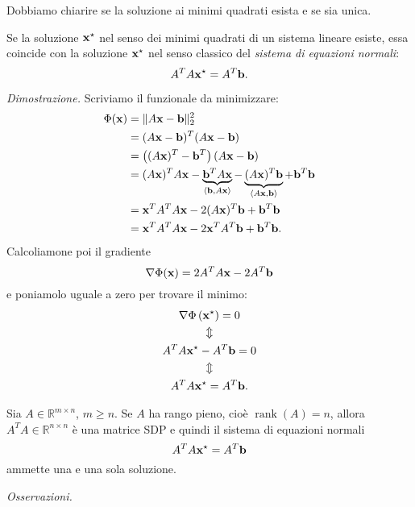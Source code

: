 Dobbiamo chiarire se la soluzione ai minimi quadrati esista e se sia unica.
\begin{lemma}
Se la soluzione $\mathbf{x}^{\star }$ nel senso dei minimi quadrati di un sistema lineare esiste, essa coincide con la soluzione $\mathbf{x}^{\star }$ nel senso classico del \textit{sistema di equazioni normali}:
\begin{equation*}
A^{T} A\mathbf{x}^{\star } =A^{T}\mathbf{b}.
\end{equation*}
\end{lemma}
\textit{Dimostrazione.}
Scriviamo il funzionale da minimizzare:
\begin{align*}
\Phi (\mathbf{x}) & =\Vert A\mathbf{x} -\mathbf{b}\Vert ^{2}_{2}\\
 & =( A\mathbf{x} -\mathbf{b})^{T}( A\mathbf{x} -\mathbf{b})\\
 & =\left(( A\mathbf{x})^{T} -\mathbf{b}^{T}\right)( A\mathbf{x} -\mathbf{b})\\
 & =( A\mathbf{x})^{T} A\mathbf{x}-\underbrace{\mathbf{b}^{T}A\mathbf{x}}_{\langle \mathbf{b} ,A\mathbf{x} \rangle } -\underbrace{( A\mathbf{x})^{T}\mathbf{b}}_{\langle A\mathbf{x} ,\mathbf{b} \rangle } +\mathbf{b}^{T}\mathbf{b}\\
 & =\mathbf{x}^{T} A^{T} A\mathbf{x} -2( A\mathbf{x})^{T}\mathbf{b} +\mathbf{b}^{T}\mathbf{b}\\
 & =\mathbf{x}^{T} A^{T} A\mathbf{x} -2\mathbf{x}^{T} A^{T}\mathbf{b} +\mathbf{b}^{T}\mathbf{b}.
\end{align*}
Calcoliamone poi il gradiente
\begin{equation*}
\nabla \Phi (\mathbf{x}) =2A^{T} A\mathbf{x} -2A^{T}\mathbf{b}
\end{equation*}
e poniamolo uguale a zero per trovare il minimo:
\begin{gather*}
\nabla \Phi \left(\mathbf{x}^{\star }\right) =0\\
\Updownarrow \\
A^{T} A\mathbf{x}^{\star } -A^{T}\mathbf{b} =0\\
\Updownarrow \\
A^{T} A\mathbf{x}^{\star } =A^{T}\mathbf{b}.
\end{gather*}
\begin{theorem}
Sia $A\in \mathbb{R}^{m\times n}$, $m\geqslant n$.
Se $A$ ha rango pieno, cioè $\operatorname{rank}(A) =n$, allora $A^{T} A\in \mathbb{R}^{n\times n}$ è una matrice SDP e quindi il sistema di equazioni normali
\begin{equation*}
A^{T} A\mathbf{x}^{\star } =A^{T}\mathbf{b}
\end{equation*}
ammette una e una sola soluzione.
\end{theorem}
\textit{Osservazioni.}
